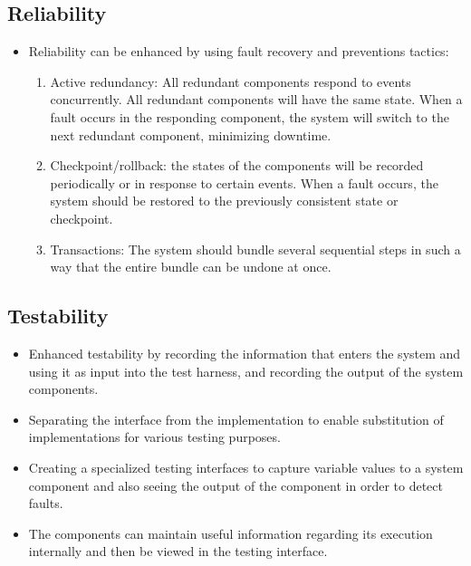 \subsection{Reliability}
	\begin{itemize}
		\item Reliability can be enhanced by using fault recovery and preventions tactics:
		\begin{enumerate}
			\item Active redundancy: All redundant components respond to events concurrently. All redundant components will have the same state. When a fault occurs in the responding component, the system will switch to the next redundant component, minimizing downtime.
			\item Checkpoint/rollback: the states of the components will be recorded periodically or in response to certain events. When a fault occurs, the system should be restored to the previously consistent state or checkpoint.
			\item Transactions: The system should bundle several sequential steps in such a way that the entire bundle can be undone at once. 
		\end{enumerate}
	\end{itemize}
\subsection{Testability}
	\begin{itemize}
		\item Enhanced testability by recording the information that enters the system and using it as input into the test harness, and recording the output of the system components.
		\item Separating the interface from the implementation to enable substitution of implementations for various testing purposes.
		\item Creating a specialized testing interfaces to capture variable values to a system component and also seeing the output of the component in order to detect faults.
		\item The components can maintain useful information regarding its execution internally and then be viewed in the testing interface.
	\end{itemize}